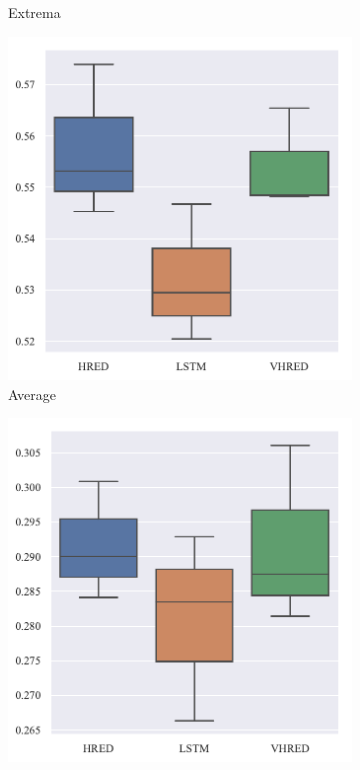 \begin{figure}[H]
\begin{subfigure}{0.24\linewidth}
        \centering
        \caption{Extrema}
    \end{subfigure}%
    \begin{subfigure}{0.24\linewidth}
        \includegraphics[width=\linewidth]{figure/boxplot/model/embedding_based_vector_average/plot.pdf}
        \centering
        \caption{Average}
    \end{subfigure}%
    \begin{subfigure}{0.24\linewidth}
        \includegraphics[width=\linewidth]{figure/boxplot/model/embedding_based_vector_extrema/plot.pdf}

\end{subfigure}
\end{figure}
